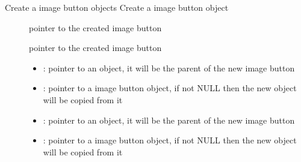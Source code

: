 \documentclass[letterpaper,10pt,english]{sphinxmanual}
\begin{document}
\begin{fulllineitems}
\label{\detokenize{object-types/imgbtn:_CPPv416lv_imgbtn_createP8lv_obj_tPK8lv_obj_t}}%
\pysigstartmultiline
{}\label{\detokenize{object-types/imgbtn:lv__imgbtn_8h_1a330d598dd1fd4fdd30cfa0e8652cafd0}}%
\pysigstopmultiline
Create a image button objects 
Create a image button object 
\begin{description}
\item[{}] \leavevmode
pointer to the created image button

\item[{}] \leavevmode
pointer to the created image button 

\item[{}] \leavevmode\begin{itemize}
\item {} 
: pointer to an object, it will be the parent of the new image button 

\item {} 
: pointer to a image button object, if not NULL then the new object will be copied from it 

\end{itemize}

\item[{}] \leavevmode\begin{itemize}
\item {} 
: pointer to an object, it will be the parent of the new image button 

\item {} 
: pointer to a image button object, if not NULL then the new object will be copied from it 

\end{itemize}

\end{description}


\end{fulllineitems}

\end{document}
